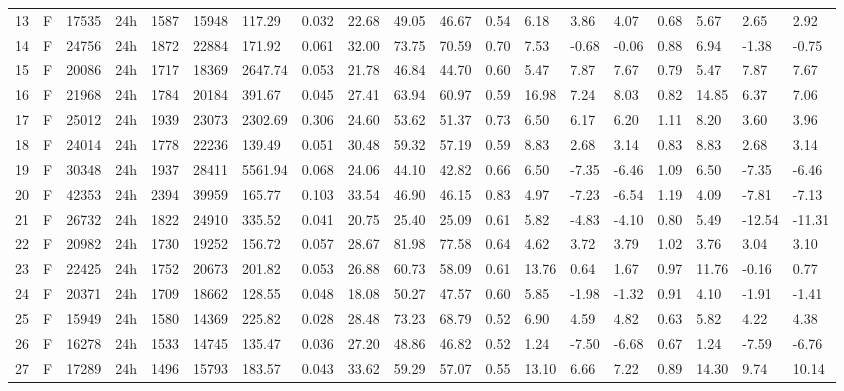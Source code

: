 \begin{tabular}{rllllllrlllllllllll}
13 & F & 17535 & 24h & 1587 & 15948 & 117.29 & 0.032 & 22.68 & 49.05 & 46.67 & 0.54 & 6.18 & 3.86 & 4.07 & 0.68 & 5.67 & 2.65 & 2.92 \\
14 & F & 24756 & 24h & 1872 & 22884 & 171.92 & 0.061 & 32.00 & 73.75 & 70.59 & 0.70 & 7.53 & -0.68 & -0.06 & 0.88 & 6.94 & -1.38 & -0.75 \\
15 & F & 20086 & 24h & 1717 & 18369 & 2647.74 & 0.053 & 21.78 & 46.84 & 44.70 & 0.60 & 5.47 & 7.87 & 7.67 & 0.79 & 5.47 & 7.87 & 7.67 \\
16 & F & 21968 & 24h & 1784 & 20184 & 391.67 & 0.045 & 27.41 & 63.94 & 60.97 & 0.59 & 16.98 & 7.24 & 8.03 & 0.82 & 14.85 & 6.37 & 7.06 \\
17 & F & 25012 & 24h & 1939 & 23073 & 2302.69 & 0.306 & 24.60 & 53.62 & 51.37 & 0.73 & 6.50 & 6.17 & 6.20 & 1.11 & 8.20 & 3.60 & 3.96 \\
18 & F & 24014 & 24h & 1778 & 22236 & 139.49 & 0.051 & 30.48 & 59.32 & 57.19 & 0.59 & 8.83 & 2.68 & 3.14 & 0.83 & 8.83 & 2.68 & 3.14 \\
19 & F & 30348 & 24h & 1937 & 28411 & 5561.94 & 0.068 & 24.06 & 44.10 & 42.82 & 0.66 & 6.50 & -7.35 & -6.46 & 1.09 & 6.50 & -7.35 & -6.46 \\
20 & F & 42353 & 24h & 2394 & 39959 & 165.77 & 0.103 & 33.54 & 46.90 & 46.15 & 0.83 & 4.97 & -7.23 & -6.54 & 1.19 & 4.09 & -7.81 & -7.13 \\
21 & F & 26732 & 24h & 1822 & 24910 & 335.52 & 0.041 & 20.75 & 25.40 & 25.09 & 0.61 & 5.82 & -4.83 & -4.10 & 0.80 & 5.49 & -12.54 & -11.31 \\
22 & F & 20982 & 24h & 1730 & 19252 & 156.72 & 0.057 & 28.67 & 81.98 & 77.58 & 0.64 & 4.62 & 3.72 & 3.79 & 1.02 & 3.76 & 3.04 & 3.10 \\
23 & F & 22425 & 24h & 1752 & 20673 & 201.82 & 0.053 & 26.88 & 60.73 & 58.09 & 0.61 & 13.76 & 0.64 & 1.67 & 0.97 & 11.76 & -0.16 & 0.77 \\
24 & F & 20371 & 24h & 1709 & 18662 & 128.55 & 0.048 & 18.08 & 50.27 & 47.57 & 0.60 & 5.85 & -1.98 & -1.32 & 0.91 & 4.10 & -1.91 & -1.41 \\
25 & F & 15949 & 24h & 1580 & 14369 & 225.82 & 0.028 & 28.48 & 73.23 & 68.79 & 0.52 & 6.90 & 4.59 & 4.82 & 0.63 & 5.82 & 4.22 & 4.38 \\
26 & F & 16278 & 24h & 1533 & 14745 & 135.47 & 0.036 & 27.20 & 48.86 & 46.82 & 0.52 & 1.24 & -7.50 & -6.68 & 0.67 & 1.24 & -7.59 & -6.76 \\
27 & F & 17289 & 24h & 1496 & 15793 & 183.57 & 0.043 & 33.62 & 59.29 & 57.07 & 0.55 & 13.10 & 6.66 & 7.22 & 0.89 & 14.30 & 9.74 & 10.14 \\

\end{tabular}
